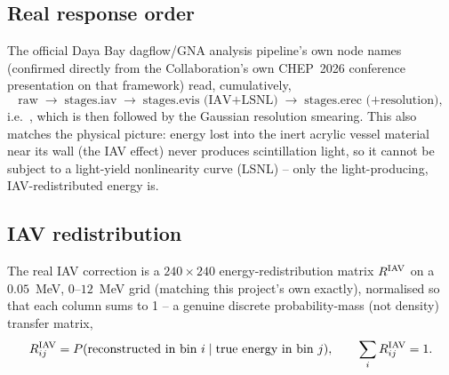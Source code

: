 \begin{theorybox}
\subsection*{Real response order}
The official Daya Bay dagflow/GNA analysis pipeline's own node names
(confirmed directly from the Collaboration's own CHEP~2026 conference
presentation on that framework) read, cumulatively,
\begin{equation}
  \text{raw} \;\longrightarrow\; \text{stages.iav} \;\longrightarrow\;
  \text{stages.evis (IAV+LSNL)} \;\longrightarrow\; \text{stages.erec (+resolution)},
\end{equation}
i.e.\ , which is then followed by the Gaussian resolution smearing. This
also matches the physical picture: energy lost into the inert acrylic
vessel material near its wall (the IAV effect) never produces
scintillation light, so it cannot be subject to a light-yield nonlinearity
curve (LSNL) -- only the light-producing, IAV-redistributed energy is.

\subsection*{IAV redistribution}
The real IAV correction is a $240\times240$ energy-redistribution matrix
$R^{\rm IAV}$ on a $0.05$~MeV, $0$--$12$~MeV grid (matching this project's
own  exactly), normalised so that each column sums to
1 -- a genuine discrete probability-mass (not density) transfer matrix,
\begin{equation}
  R^{\rm IAV}_{ij} = P(\text{reconstructed in bin } i \mid \text{true energy in bin } j),
  \qquad \sum_i R^{\rm IAV}_{ij} = 1.
\end{equation}


\end{theorybox}
